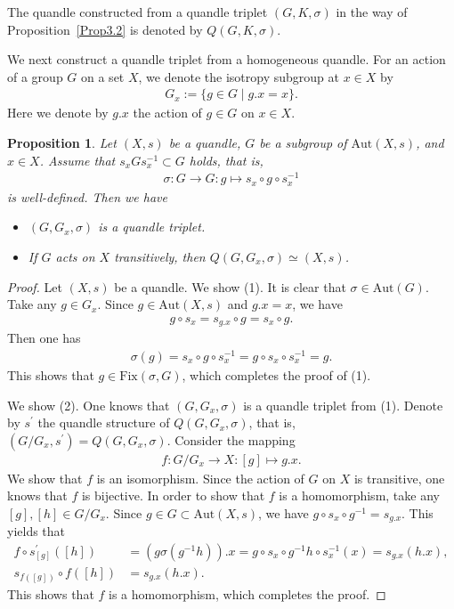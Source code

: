 \documentclass[12pt]{amsart}
\newtheorem{Prop}{Proposition}[section]
\theoremstyle{definition}
\begin{document}
The quandle constructed from a quandle triplet $ (G,K,\sigma) $ in the way of Proposition~\ref{Prop3.2} is denoted by $ Q(G,K,\sigma) $.

We next construct a quandle triplet from a homogeneous quandle. For an action of a group $ G $ on a set $ X $, we denote the isotropy subgroup at $ x \in X $ by
\begin{align*}
G_{x} := \{ g \in G \mid g.x = x \}.
\end{align*}
Here we denote by $ g.x $ the action of $ g \in G $ on $ x \in X $.

\begin{Prop}\label{Prop3.3}
Let $ (X,s) $ be a quandle, $ G $ be a subgroup of $ {\mathrm{Aut}}(X,s) $, and $ x \in X $. Assume that $ s_{x} G s^{-1}_{x} \subset G $ holds, that is, 
\begin{align*}
\sigma : G \rightarrow G : g \mapsto s_{x} \circ g \circ s^{-1}_{x}
\end{align*}
is well-defined. Then we have
\begin{itemize}
\item[(1)]
$ (G,G_{x},\sigma) $ is a quandle triplet.
\item[(2)]
If $ G $ acts on $ X $ transitively, then $ Q(G,G_{x},\sigma) \simeq (X,s) $.
\end{itemize}
\end{Prop}

\begin{proof}
Let $ (X,s) $ be a quandle. We show (1). It is clear that $ \sigma \in {\mathrm{Aut}}(G) $. Take any $ g \in G_{x} $. Since $ g \in {\mathrm{Aut}}(X,s) $ and $ g.x = x $, we have
\begin{align*}
g \circ s_{x} = s_{g.x} \circ g = s_{x} \circ g.
\end{align*}
Then one has
\begin{align*}
\sigma(g) = s_{x} \circ g \circ s^{-1}_{x} = g \circ s_{x} \circ s^{-1}_{x} = g.
\end{align*}
This shows that $ g \in {\mathrm{Fix}}(\sigma,G) $, which completes the proof of (1).

We show (2). One knows that $ (G,G_{x},\sigma) $ is a quandle triplet from (1). Denote by $ s^{\prime} $ the quandle structure of $ Q(G,G_{x},\sigma) $, that is, $ (G/G_{x}, s^{\prime}) = Q(G,G_{x},\sigma) $. Consider the mapping
\begin{align*}
f : G/G_{x} \rightarrow X : [g] \mapsto g.x.
\end{align*}
We show that $ f $ is an isomorphism. Since the action of $ G $ on $ X $ is transitive, one knows that $ f $ is bijective. In order to show that $ f $ is a homomorphism, take any $ [g],[h] \in G/G_{x} $. Since $ g \in G \subset {\mathrm{Aut}}(X,s) $, we have $ g \circ s_{x} \circ g^{-1} = s_{g.x} $. This yields that
\begin{align*}
f \circ s^{\prime}_{[g]}([h]) &= (g \sigma(g^{-1}h)).x = g \circ s_{x} \circ g^{-1} h \circ s^{-1}_{x}(x) = s_{g.x} (h.x),\\
s_{f([g])} \circ f([h]) &= s_{g.x} (h.x).
\end{align*}
This shows that $ f $ is a homomorphism, which completes the proof.
\end{proof}
\end{document}
